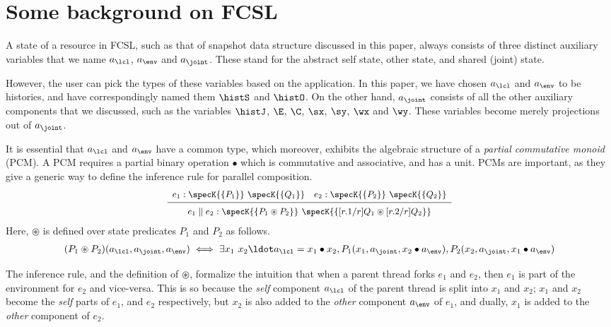 \section{Some background on FCSL}
\label{sc:background}

A state of a resource in FCSL, such as that of snapshot data structure
discussed in this paper, always consists of three distinct auxiliary
variables that we name $a_\lcl$, $a_\env$ and $a_\joint$. These stand
for the abstract self state, other state, and shared (joint) state.

However, the user can pick the types of these variables based on the
application. In this paper, we have chosen $a_\lcl$ and $a_\env$ to be
histories, and have correspondingly named them $\histS$ and $\histO$.
On the other hand, $a_\joint$ consists of all the other auxiliary
components that we discussed, such as the variables $\histJ$, $\E$,
$\C$, $\sx$, $\sy$, $\wx$ and $\wy$. These variables become merely
projections out of $a_\joint$.

It is essential that $a_\lcl$ and $a_\env$ have a common type, which
moreover, exhibits the algebraic structure of a \emph{partial
  commutative monoid} (PCM). A PCM requires a partial binary operation
$\bullet$ which is commutative and associative, and has a unit. 
%
%
PCMs are important, as they give a generic way to define the inference
rule for parallel composition.
%
\[
{\small{
\begin{array}{c}
e_1 : \specK{\{P_1\}}\ \specK{\{Q_1\}} \quad e_2 : \specK{\{P_2\}}\ \specK{\{Q_2\}} \\[2pt]
\hline\\[-7pt]
e_1 \parallel e_2 : \specK{\{P_1 \circledast P_2\}}\ \specK{\{[r.1/r]Q_1 \circledast [r.2/r]Q_2\}} 
\end{array}
}}
\]
Here, $\circledast$ is defined over state predicates $P_1$ and $P_2$
as follows.
\[
\begin{array}{c}
  (P_1 \circledast P_2) (a_\lcl, a_\joint, a_\env) \iff
\exists x_1~x_2\ldot a_\lcl = x_1 \bullet x_2, \hbox{}
 P_1 (x_1, a_\joint, x_2 \bullet a_\env), P_2 (x_2, a_\joint, x_1 \bullet a_\env)
\end{array}
\]

The inference rule, and the definition of $\circledast$, formalize the
intuition that when a parent thread forks $e_1$ and $e_2$, then $e_1$
is part of the environment for $e_2$ and vice-versa. This is so
because the \emph{self} component $a_\lcl$ of the parent thread is
split into $x_1$ and $x_2$; $x_1$ and $x_2$ become the \emph{self}
parts of $e_1$, and $e_2$ respectively, but $x_2$ is also added to the
\emph{other} component $a_\env$ of $e_1$, and dually, $x_1$ is added
to the \emph{other} component of $e_2$.

